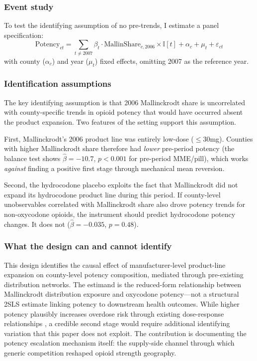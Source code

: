 \documentclass[12pt]{article}
\newcommand{\ind}{\mathbb{I}}
\begin{document}
\subsubsection*{Event study} To test the identifying assumption of no pre-trends, I estimate a panel specification:
\begin{equation}
\text{Potency}_{ct} = \sum_{t \neq 2007} \beta_t \cdot \text{MallinShare}_{c,2006} \times \ind[t] + \alpha_c + \mu_t + \varepsilon_{ct}
\label{eq:eventstudy}
\end{equation}
with county ($\alpha_c$) and year ($\mu_t$) fixed effects, omitting 2007 as the reference year.

\subsubsection*{Identification assumptions} The key identifying assumption is that 2006 Mallinckrodt share is uncorrelated with county-specific trends in opioid potency that would have occurred absent the product expansion. Two features of the setting support this assumption.

First, Mallinckrodt's 2006 product line was entirely low-dose ($\leq$30mg). Counties with higher Mallinckrodt share therefore had \emph{lower} pre-period potency (the balance test shows $\hat{\beta} = -10.7$, $p < 0.001$ for pre-period MME/pill), which works \emph{against} finding a positive first stage through mechanical mean reversion.

Second, the hydrocodone placebo exploits the fact that Mallinckrodt did not expand its hydrocodone product line during this period. If county-level unobservables correlated with Mallinckrodt share also drove potency trends for non-oxycodone opioids, the instrument should predict hydrocodone potency changes. It does not ($\hat{\beta} = -0.035$, $p = 0.48$).

\subsubsection*{What the design can and cannot identify} This design identifies the causal effect of manufacturer-level product-line expansion on county-level potency composition, mediated through pre-existing distribution networks. The estimand is the reduced-form relationship between Mallinckrodt distribution exposure and oxycodone potency---not a structural 2SLS estimate linking potency to downstream health outcomes. While higher potency plausibly increases overdose risk through existing dose-response relationships \citep{bohnert2011association}, a credible second stage would require additional identifying variation that this paper does not exploit. The contribution is documenting the potency escalation mechanism itself: the supply-side channel through which generic competition reshaped opioid strength geography.
\end{document}

